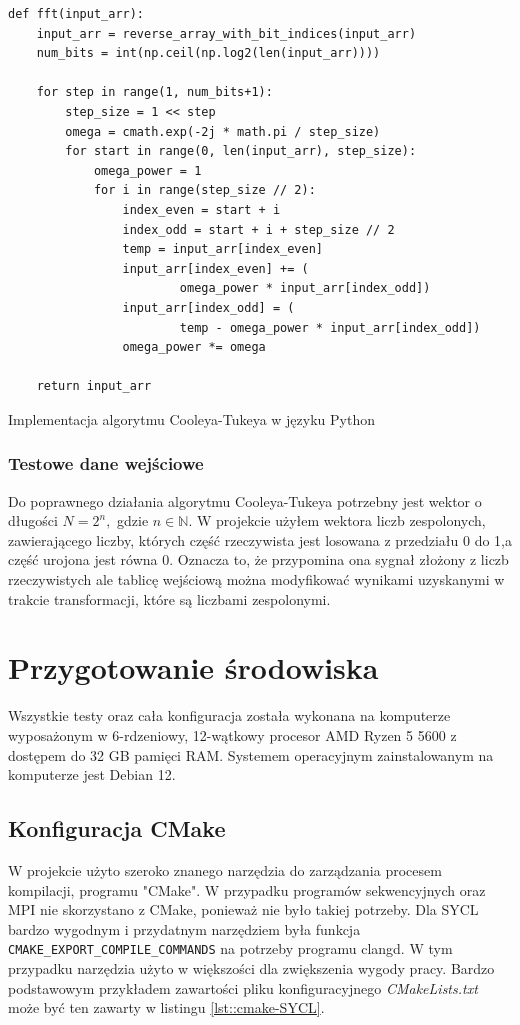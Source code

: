 \documentclass[a4paper,12pt]{book} %
\begin{document}
\begin{lstfloat}[H]
\lstset{language=Python}
\begin{lstlisting}[frame=single]
def fft(input_arr):
    input_arr = reverse_array_with_bit_indices(input_arr)
    num_bits = int(np.ceil(np.log2(len(input_arr))))

    for step in range(1, num_bits+1):
        step_size = 1 << step
        omega = cmath.exp(-2j * math.pi / step_size)
        for start in range(0, len(input_arr), step_size):
            omega_power = 1
            for i in range(step_size // 2):
                index_even = start + i
                index_odd = start + i + step_size // 2
                temp = input_arr[index_even]
                input_arr[index_even] += (
                        omega_power * input_arr[index_odd])
                input_arr[index_odd] = (
                        temp - omega_power * input_arr[index_odd])
                omega_power *= omega

    return input_arr
\end{lstlisting}
\caption{Implementacja algorytmu Cooleya-Tukeya w języku Python}
\label{lst:fft_python}
\end{lstfloat}
\subsubsection{Testowe dane wejściowe}
Do poprawnego działania algorytmu Cooleya-Tukeya potrzebny jest wektor o długości $N = 2^n,$ gdzie $n \in \mathbb{N}$. W projekcie użyłem wektora liczb zespolonych, zawierającego liczby, których część rzeczywista jest losowana z przedziału 0 do 1,a część urojona jest równa 0. Oznacza to, że przypomina ona sygnał złożony z liczb rzeczywistych ale tablicę wejściową można modyfikować wynikami uzyskanymi w trakcie transformacji, które są liczbami zespolonymi.
\section{Przygotowanie środowiska}
Wszystkie testy oraz cała konfiguracja została wykonana na komputerze wyposażonym w 6-rdzeniowy, 12-wątkowy procesor AMD Ryzen 5 5600 z dostępem do 32 GB pamięci RAM.
Systemem operacyjnym zainstalowanym na komputerze jest Debian 12.
\subsection{Konfiguracja CMake}
W projekcie użyto szeroko znanego narzędzia do zarządzania procesem kompilacji, programu "CMake". W przypadku programów sekwencyjnych oraz MPI nie skorzystano z CMake, ponieważ nie było takiej potrzeby.
Dla SYCL bardzo wygodnym i przydatnym narzędziem była funkcja \texttt{CMAKE\_EXPORT\_COMPILE\_COMMANDS} na potrzeby programu clangd. W tym przypadku narzędzia użyto w większości dla zwiększenia wygody pracy. Bardzo podstawowym przykładem zawartości pliku konfiguracyjnego \emph{CMakeLists.txt} może być ten zawarty w listingu \ref{lst::cmake-SYCL}.
\end{document}
